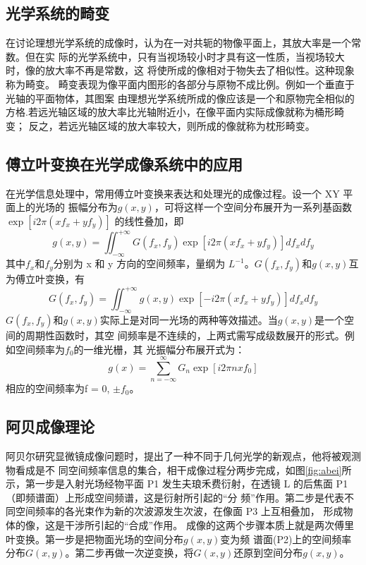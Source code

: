 \documentclass[10pt,a4paper,twoside,UTF8]{ctexart}
\begin{document}
\subsection{光学系统的畸变}
在讨论理想光学系统的成像时，认为在一对共轭的物像平面上，其放大率是一个常数。但在实
际的光学系统中，只有当视场较小时才具有这一性质，当视场较大时，像的放大率不再是常数，这
将使所成的像相对于物失去了相似性。这种现象称为畸变。
畸变表现为像平面内图形的各部分与原物不成比例。例如一个垂直于光轴的平面物体，其图案
由理想光学系统所成的像应该是一个和原物完全相似的方格.若远光轴区域的放大率比光轴附近小，在像平面内实际成像就称为桶形畸变；
反之，若远光轴区域的放大率较大，则所成的像就称为枕形畸变。

\subsection{傅立叶变换在光学成像系统中的应用}
在光学信息处理中，常用傅立叶变换来表达和处理光的成像过程。设一个 XY 平面上的光场的
振幅分布为$g(x, y)$，可将这样一个空间分布展开为一系列基函数$\exp \left[i 2 \pi\left(x f_{x}+y f_{y}\right)\right]$ 的线性叠加，即
\begin{equation}
	g(x, y)=\iint_{-\infty}^{+\infty} G\left(f_{x}, f_{y}\right) \exp \left[i 2 \pi\left(x f_{x}+y f_{y}\right)\right] d f_{x} d f_{y}
\end{equation}
其中$f_x$和$f_y$分别为 x 和 y 方向的空间频率，量纲为 $L^{-1}$。$G(f_x, f_y)$和$g(x, y)$互为傅立叶变换，有
\begin{equation}
	G\left(f_{x}, f_{y}\right)=\iint_{-\infty}^{+\infty} g(x, y) \exp \left[-i 2 \pi\left(x f_{x}+y f_{y}\right)\right] d f_{x} d f_{y}
\end{equation}
$G(f_x, f_y)$和$g(x, y)$实际上是对同一光场的两种等效描述。当$g(x, y)$是一个空间的周期性函数时，其空
间频率是不连续的，上两式需写成级数展开的形式。例如空间频率为$f_0$的一维光栅，其
光振幅分布展开式为：
\begin{equation}
	g(x)=\sum_{n=-\infty}^{\infty} G_{n} \exp \left[i 2 \pi n x f_{0}\right]
\end{equation}
相应的空间频率为f = 0, $\pm f_0$。

\subsection{阿贝成像理论}
阿贝尔研究显微镜成像问题时，提出了一种不同于几何光学的新观点，他将被观测物看成是不
同空间频率信息的集合，相干成像过程分两步完成，如图\ref{fig:abei}所示，第一步是入射光场经物平面
P1 发生夫琅禾费衍射，在透镜 L 的后焦面 P1（即频谱面）上形成空间频谱，这是衍射所引起的“分
频”作用。第二步是代表不同空间频率的各光束作为新的次波源发生次波，在像面 P3 上互相叠加，
形成物体的像，这是干涉所引起的“合成”作用。
成像的这两个步骤本质上就是两次傅里叶变换。第一步是把物面光场的空间分布$g(x, y)$变为频
谱面(P2)上的空间频率分布$G(x, y)$。第二步再做一次逆变换，将$G(x, y)$还原到空间分布$g(x, y)$。
\end{document}
